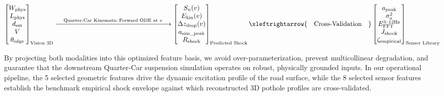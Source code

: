 \begin{equation}
    \begin{bmatrix}
        W_{\text{phys}} \\
        L_{\text{phys}} \\
        d_{\text{est}} \\
        V \\
        \theta_{\text{edge}}
    \end{bmatrix}_{\text{Vision 3D}}
    \xrightarrow{\quad \text{Quarter-Car Kinematic Forward ODE at } v \quad}
    \begin{bmatrix}
        S_n(v) \\
        E_{\text{kin}}(v) \\
        \Delta z_{\text{drop}}(v) \\
        a_{\text{sim\_peak}} \\
        R_{\text{shock}}
    \end{bmatrix}_{\text{Predicted Shock}}
    \xleftrightarrow{\quad \text{Cross-Validation} \quad}
    \begin{bmatrix}
        a_{\text{peak}} \\
        \sigma_a^2 \\
        E_{\text{FFT}}^{3\text{--}12\text{Hz}} \\
        J_{\text{shock}} \\
        \zeta_{\text{empirical}}
    \end{bmatrix}_{\text{Sensor Library}}
    \label{eq:cross_modal_coupling_vector}
\end{equation}

By projecting both modalities into this optimized feature basis, we avoid over-parameterization, prevent multicollinear degradation, and guarantee that the downstream Quarter-Car suspension simulation operates on robust, physically grounded inputs. In our operational pipeline, the 5 selected geometric features drive the dynamic excitation profile of the road surface, while the 8 selected sensor features establish the benchmark empirical shock envelope against which reconstructed 3D pothole profiles are cross-validated.

